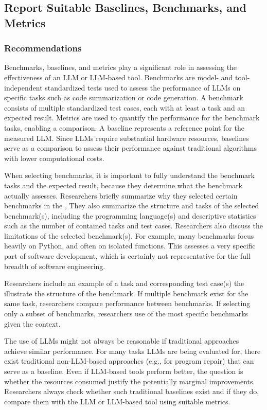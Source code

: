 



\subsection{Report Suitable Baselines, Benchmarks, and Metrics}

\subsubsection{Recommendations}

Benchmarks, baselines, and metrics play a significant role in assessing the effectiveness of an LLM or LLM-based tool.
Benchmarks are model- and tool-independent standardized tests used to assess the performance of LLMs on specific tasks such as code summarization or code generation.
A benchmark consists of multiple standardized test cases, each with at least a task and an expected result.
Metrics are used to quantify the performance for the benchmark tasks, enabling a comparison.
A baseline represents a reference point for the measured LLM.
Since LLMs require substantial hardware resources, baselines serve as a comparison to assess their performance against traditional algorithms with lower computational costs.

When selecting benchmarks, it is important to fully understand the benchmark tasks and the expected result, because they determine what the benchmark actually assesses.
Researchers \must briefly summarize why they selected certain benchmarks in the \paper, 
They \should also summarize the structure and tasks of the selected benchmark(s), including the programming language(s) and descriptive statistics such as the number of contained tasks and test cases.
Researchers \should also discuss the limitations of the selected benchmark(s).
For example, many benchmarks focus heavily on Python, and often on isolated functions.
This assesses a very specific part of software development, which is certainly not representative for the full breadth of software engineering.

Researchers \may include an example of a task and corresponding test case(s) the illustrate the structure of the benchmark.
If multiple benchmark exist for the same task, researchers \should compare performance between benchmarks.
If selecting only a subset of benchmarks, researchers \should use of the most specific benchmarks given the context.

The use of LLMs might not always be reasonable if traditional approaches achieve similar performance. 
For many tasks LLMs are being evaluated for, there exist traditional non-LLM-based approaches (e.g., for program repair) that can serve as a baseline.
Even if LLM-based tools perform better, the question is whether the resources consumed justify the potentially marginal improvements.
Researchers \should always check whether such traditional baselines exist and if they do, compare them with the LLM or LLM-based tool using suitable metrics.

